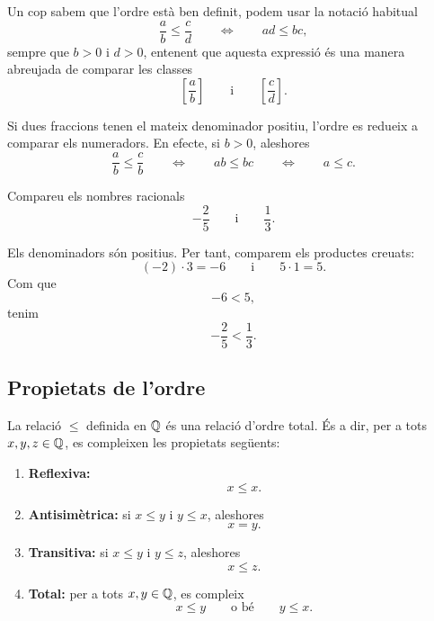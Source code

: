 Un cop sabem que l'ordre està ben definit, podem usar la notació habitual
\[
	\frac{a}{b}\leq\frac{c}{d}
	\qquad\Longleftrightarrow\qquad
	ad\leq bc,
\]
sempre que \(b>0\) i \(d>0\), entenent que aquesta expressió és una manera abreujada de comparar les classes
\[
	\left[\frac{a}{b}\right]
	\qquad\text{i}\qquad
	\left[\frac{c}{d}\right].
\]

\begin{observacio}
Si dues fraccions tenen el mateix denominador positiu, l'ordre es redueix a comparar els numeradors. En efecte, si \(b>0\), aleshores
\[
	\frac{a}{b}\leq\frac{c}{b}
	\qquad\Longleftrightarrow\qquad
	ab\leq bc
	\qquad\Longleftrightarrow\qquad
	a\leq c.
\]
\end{observacio}

\begin{exemple}
Compareu els nombres racionals
\[
	-\frac{2}{5}
	\qquad\text{i}\qquad
	\frac{1}{3}.
\]
\end{exemple}

\begin{solucio}
Els denominadors són positius. Per tant, comparem els productes creuats:
\[
	(-2)\cdot3=-6
	\qquad\text{i}\qquad
	5\cdot1=5.
\]
Com que
\[
	-6<5,
\]
tenim
\[
	-\frac{2}{5}<\frac{1}{3}.
\]
\end{solucio}

\subsection{Propietats de l'ordre}

\begin{proposicio}
La relació \(\leq\) definida en \(\mathbb{Q}\) és una relació d'ordre total. És a dir, per a tots \(x,y,z\in\mathbb{Q}\), es compleixen les propietats següents:
\begin{enumerate}
	\item \textbf{Reflexiva:}
	\[
		x\leq x.
	\]

	\item \textbf{Antisimètrica:}
	si \(x\leq y\) i \(y\leq x\), aleshores
	\[
		x=y.
	\]

	\item \textbf{Transitiva:}
	si \(x\leq y\) i \(y\leq z\), aleshores
	\[
		x\leq z.
	\]

	\item \textbf{Total:}
	per a tots \(x,y\in\mathbb{Q}\), es compleix
	\[
		x\leq y
		\qquad\text{o bé}\qquad
		y\leq x.
	\]
\end{enumerate}
\end{proposicio}

